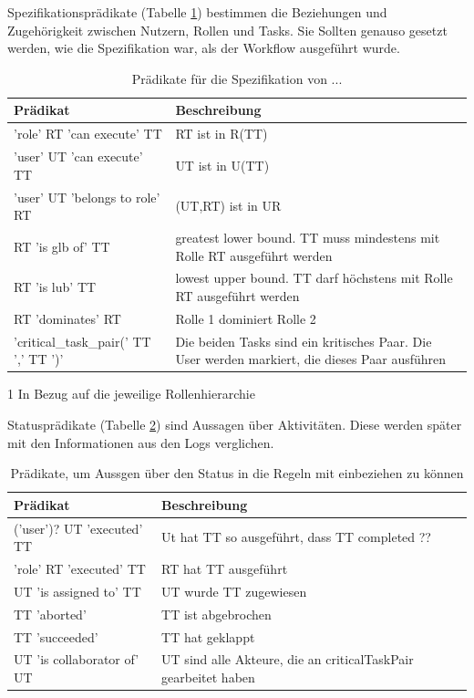 Spezifikationsprädikate (Tabelle \ref{tab:specification}) bestimmen die Beziehungen und Zugehörigkeit zwischen Nutzern, Rollen und Tasks. Sie Sollten genauso gesetzt werden, wie die Spezifikation war, als der Workflow ausgeführt wurde.
\begin{table}[h]
\begin{tabular} {|p{6cm}|p{10cm}|}
\hline
\textbf{Prädikat} & \textbf{Beschreibung}\\
\hline
'role' RT 'can execute' TT	& RT ist in  R(TT)\\
\hline
'user' UT 'can execute' TT 	& UT ist in U(TT)\\
\hline
'user' UT 'belongs to role' RT  & (UT,RT) ist in UR\\
\hline
RT 'is glb of' TT 		& greatest lower bound. TT muss mindestens mit Rolle RT ausgeführt werden\tnote{1}\\
\hline
RT 'is lub' TT 			& lowest upper bound. TT darf höchstens mit Rolle RT ausgeführt werden\tnote{1}\\
\hline
RT 'dominates' RT 		& Rolle 1 dominiert Rolle 2\tnote{1}\\
\hline
'critical{\_}task{\_}pair(' TT ',' TT ')'& Die beiden Tasks sind ein kritisches Paar. Die User werden markiert, die dieses Paar ausführen\\
\hline
\end{tabular}
\begin{tablenotes}\footnotesize 
\item[1] In Bezug auf die jeweilige Rollenhierarchie 
\end{tablenotes}
\caption{Prädikate für die Spezifikation von ...}
\label{tab:specification}
\end{table}

Statusprädikate (Tabelle \ref{tab:status}) sind Aussagen über Aktivitäten. Diese werden später mit den Informationen aus den Logs verglichen. 
\begin{table}[h]
\begin{tabular} {|p{6cm}|p{10cm}|}
\hline
\textbf{Prädikat} & \textbf{Beschreibung}\\
\hline
('user')? UT 'executed' TT      & Ut hat TT so ausgeführt, dass TT completed ??\\
\hline
'role' RT 'executed' TT		& RT hat TT ausgeführt\\
\hline
UT 'is assigned to' TT		& UT wurde TT zugewiesen\\
\hline
TT 'aborted'			& TT ist abgebrochen\\
\hline
TT 'succeeded'			& TT hat geklappt \\
\hline
UT 'is collaborator of' UT	& UT sind alle Akteure, die an criticalTaskPair gearbeitet haben\\
\hline
\end{tabular}
\caption{Prädikate, um Aussgen über den Status in die Regeln mit einbeziehen zu können}
\label{tab:status}
\end{table}

